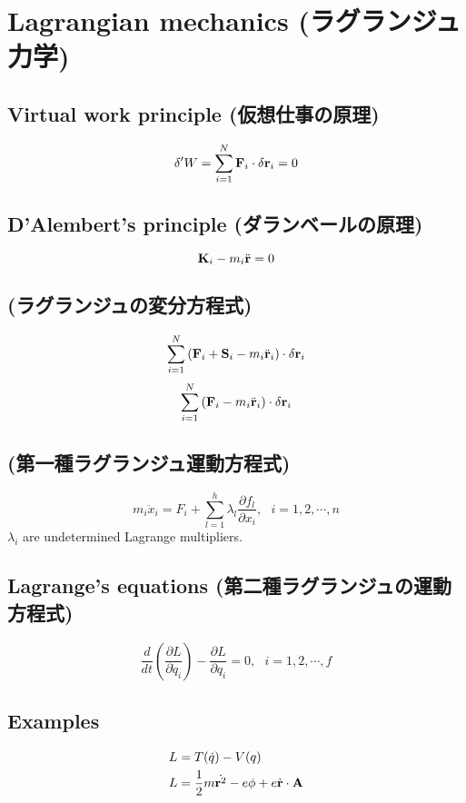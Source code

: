 %
%
\section{Lagrangian mechanics (ラグランジュ力学)}


\subsection{Virtual work principle (仮想仕事の原理)}
\begin{equation}
  {\delta}' W = \sum^{N}_{i=1} {\bf F}_i \cdot \delta {\bf r}_i = 0
\end{equation}

\subsection{D'Alembert's principle (ダランベールの原理)}
\begin{equation}
  {\bf K}_i - m_i \ddot{\bf{r}} = 0
\end{equation}

\subsection{(ラグランジュの変分方程式)}
\[ \sum^{N}_{i=1} \left( {\bf F}_i + {\bf S}_i - m_i \ddot{\bf r}_i \right) \cdot \delta {\bf r}_i \]
\[ \sum^{N}_{i=1} \left( {\bf F}_i - m_i \ddot{\bf r}_i \right) \cdot \delta {\bf r}_i \]


\subsection{(第一種ラグランジュ運動方程式)}
\begin{equation}
  m_i \ddot{x}_i = F_i + \sum^{h}_{l=1} {\lambda}_l \frac{ \partial f_l }{ \partial x_i } ,\ \ \  i = 1,2,\cdots ,n
\end{equation}
$ \lambda_i $ are undetermined Lagrange multipliers.


\subsection{Lagrange's equations (第二種ラグランジュの運動方程式)}
\begin{equation}
  \frac{ d }{ dt } \left( \frac{ \partial L }{ \partial \dot{q}_i } \right) - \frac{ \partial L }{ \partial q_i } = 0 , \ \ \  i = 1,2,\cdots , f
\end{equation}


\subsection{Examples}
\begin{align}
  L & = T (\dot q) - V(q) \\
  L & = \frac{ 1 }{ 2 } m \dot{{\bf{r}}^2} - e \phi + e \dot{ \bf r } \cdot \bf{A} \\
\end{align}
